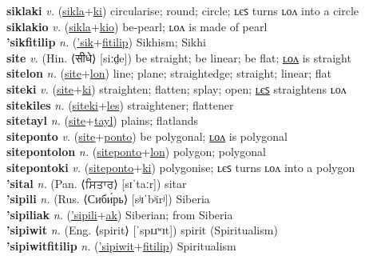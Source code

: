 \textbf{siklaki} \textit{v.} (\hyperref[sikla]{sikla}+\hyperref[ki]{ki})
circularise; round; circle; ʟєꜱ turns ʟᴏᴧ into a circle \label{siklaki} \\
\textbf{siklakio} \textit{v.} (\hyperref[sikla]{sikla}+\hyperref[kio]{kio})
be-pearl; ʟᴏᴧ is made of pearl \label{siklakio} \\
\textbf{'sikfitilip} \textit{n.} (\hyperref['sik]{'sik}+\hyperref[fitilip]{fitilip})
Sikhism; Sikhi \label{'sikfitilip} \\
\textbf{site} \textit{v.} (Hin. ⟨सीधे⟩ [siːd̤e])
be straight; be linear; be flat; \hyperref[sitelon]{ʟᴏᴧ} is straight \label{site} \\
\textbf{sitelon} \textit{n.} (\hyperref[site]{site}+\hyperref[lon]{lon})
line; plane; straightedge; straight; linear; flat \label{sitelon} \\
\textbf{siteki} \textit{v.} (\hyperref[site]{site}+\hyperref[ki]{ki})
straighten; flatten; splay; open; \hyperref[sitekiles]{ʟєꜱ} straightens ʟᴏᴧ \label{siteki} \\
\textbf{sitekiles} \textit{n.} (\hyperref[siteki]{siteki}+\hyperref[les]{les})
straightener; flattener \label{sitekiles} \\
\textbf{sitetayl} \textit{n.} (\hyperref[site]{site}+\hyperref[tayl]{tayl})
plains; flatlands \label{sitetayl} \\
\textbf{siteponto} \textit{v.} (\hyperref[site]{site}+\hyperref[ponto]{ponto})
be polygonal; \hyperref[sitepontolon]{ʟᴏᴧ} is polygonal \label{siteponto} \\
\textbf{sitepontolon} \textit{n.} (\hyperref[siteponto]{siteponto}+\hyperref[lon]{lon})
polygon; polygonal \label{sitepontolon} \\
\textbf{sitepontoki} \textit{v.} (\hyperref[siteponto]{siteponto}+\hyperref[ki]{ki})
polygonise; ʟєꜱ turns ʟᴏᴧ into a polygon \label{sitepontoki} \\
\textbf{'sital} \textit{n.} (Pan. ⟨ਸਿਤਾਰ⟩ [sɪˈtaːr])
sitar \label{'sital} \\
\textbf{'sipili} \textit{n.} (Rus. ⟨Сиби́рь⟩ [sʲɪˈbʲirʲ])
Siberia \label{'sipili} \\
\textbf{'sipiliak} \textit{n.} (\hyperref['sipili]{'sipili}+\hyperref[ak]{ak})
Siberian; from Siberia \label{'sipiliak} \\
\textbf{'sipiwit} \textit{n.} (Eng. ⟨spirit⟩ [ˈspɪɹʷɪt])
spirit (Spiritualism) \label{'sipiwit} \\
\textbf{'sipiwitfitilip} \textit{n.} (\hyperref['sipiwit]{'sipiwit}+\hyperref[fitilip]{fitilip})
Spiritualism \label{'sipiwitfitilip} \\
